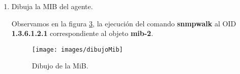 \begin{enumerate}
\textbf{Consulta snmpset: sysContact(4) sysUbication(6) Centos (figura  \ref{image:13-c}) y   (figura  \ref{image:13-c1})}
\FloatBarrier
\begin{figure}[htbp!]
		\centering
	\texttt{[image: images/13-c]}
		\caption{Se cambio el valor de sysUbication(6) "LaptopAcer" y se muestran los cambios hechos del valor inicial al final}		\label{image:13-c}
\end{figure}
\begin{figure}[htbp!]
		\centering
	\texttt{[image: images/13-c1]}
		\caption{Muestra el valor de sysContact(4) y se modifica por "CentOS" finalmente muestra el cambio.}		\label{image:13-c}
\end{figure}
\FloatBarrier



\item Dibuja la MIB del agente.

Observamos en la figura \ref{image:dibujoMib}, la ejecución del comando \textbf{snmpwalk} al OID \textbf{1.3.6.1.2.1} correspondiente al objeto \textbf{mib-2}.
\FloatBarrier
\begin{figure}[htbp!]
		\centering
	\texttt{[image: images/dibujoMib]}
		\caption{Dibujo de la MiB.}
\label{image:dibujoMib}
\end{figure}
\FloatBarrier
\end{enumerate}